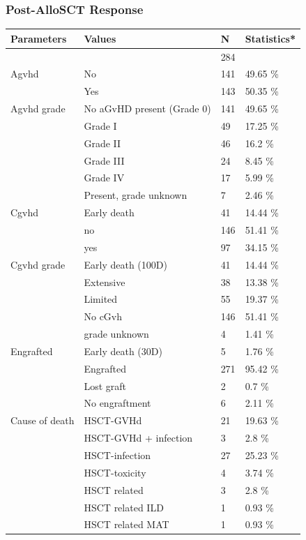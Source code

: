 \documentclass[a4paper,11pt] {article}
\begin{document}
\subsubsection{Post-AlloSCT Response}
\begin{longtable}{llll}
  \hline
Parameters & Values & N & Statistics* \\ 
  \hline
 &  & 284 &  \\ 
  Agvhd & No & 141 & 49.65 \% \\ 
   & Yes & 143 & 50.35 \% \\ 
  Agvhd grade & No aGvHD present (Grade 0) & 141 & 49.65 \% \\ 
   & Grade I & 49 & 17.25 \% \\ 
   & Grade II & 46 & 16.2 \% \\ 
   & Grade III & 24 & 8.45 \% \\ 
   & Grade IV & 17 & 5.99 \% \\ 
   & Present, grade unknown & 7 & 2.46 \% \\ 
  Cgvhd & Early death & 41 & 14.44 \% \\ 
   & no & 146 & 51.41 \% \\ 
   & yes & 97 & 34.15 \% \\ 
  Cgvhd grade & Early death (100D) & 41 & 14.44 \% \\ 
   & Extensive & 38 & 13.38 \% \\ 
   & Limited & 55 & 19.37 \% \\ 
   & No cGvh & 146 & 51.41 \% \\ 
   & grade unknown & 4 & 1.41 \% \\ 
  Engrafted & Early death (30D) & 5 & 1.76 \% \\ 
   & Engrafted & 271 & 95.42 \% \\ 
   & Lost graft & 2 & 0.7 \% \\ 
   & No engraftment & 6 & 2.11 \% \\ 
  Cause of death & HSCT-GVHd & 21 & 19.63 \% \\ 
   & HSCT-GVHd + infection & 3 & 2.8 \% \\ 
   & HSCT-infection & 27 & 25.23 \% \\ 
   & HSCT-toxicity & 4 & 3.74 \% \\ 
   & HSCT related & 3 & 2.8 \% \\ 
   & HSCT related ILD & 1 & 0.93 \% \\ 
   & HSCT related MAT & 1 & 0.93 \% \\ 

\end{longtable}
\end{document}
